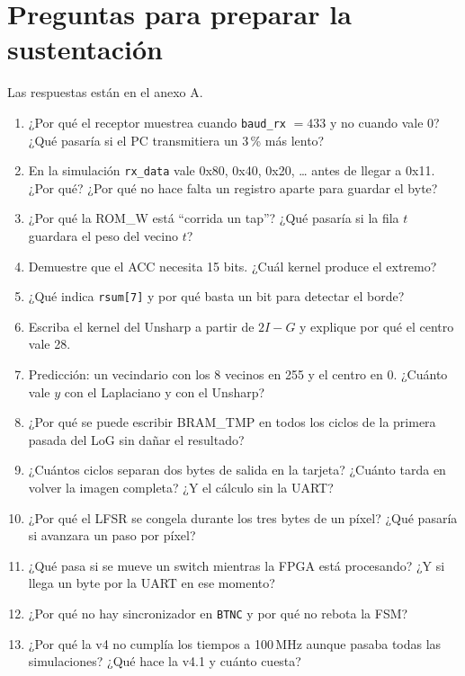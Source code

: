 \documentclass[11pt,a4paper]{article}
\newcommand{\bus}[1]{\texttt{#1}}
\begin{document}
\section{Preguntas para preparar la sustentación}
Las respuestas están en el anexo A.
\begin{enumerate}
\item ¿Por qué el receptor muestrea cuando \bus{baud\_rx} $= 433$ y no cuando vale 0? ¿Qué pasaría si el PC transmitiera un 3\,\% más lento?
\item En la simulación \bus{rx\_data} vale 0x80, 0x40, 0x20, … antes de llegar a 0x11. ¿Por qué? ¿Por qué no hace falta un registro aparte para guardar el byte?
\item ¿Por qué la ROM\_W está ``corrida un tap''? ¿Qué pasaría si la fila $t$ guardara el peso del vecino $t$?
\item Demuestre que el ACC necesita 15 bits. ¿Cuál kernel produce el extremo?
\item ¿Qué indica \bus{rsum[7]} y por qué basta un bit para detectar el borde?
\item Escriba el kernel del Unsharp a partir de $2I - G$ y explique por qué el centro vale 28.
\item Predicción: un vecindario con los 8 vecinos en 255 y el centro en 0. ¿Cuánto vale $y$ con el Laplaciano y con el Unsharp?
\item ¿Por qué se puede escribir BRAM\_TMP en todos los ciclos de la primera pasada del LoG sin dañar el resultado?
\item ¿Cuántos ciclos separan dos bytes de salida en la tarjeta? ¿Cuánto tarda en volver la imagen completa? ¿Y el cálculo sin la UART?
\item ¿Por qué el LFSR se congela durante los tres bytes de un píxel? ¿Qué pasaría si avanzara un paso por píxel?
\item ¿Qué pasa si se mueve un switch mientras la FPGA está procesando? ¿Y si llega un byte por la UART en ese momento?
\item ¿Por qué no hay sincronizador en \bus{BTNC} y por qué no rebota la FSM?
\item ¿Por qué la v4 no cumplía los tiempos a 100\,MHz aunque pasaba todas las simulaciones? ¿Qué hace la v4.1 y cuánto cuesta?
\end{enumerate}

\appendix
\end{document}
